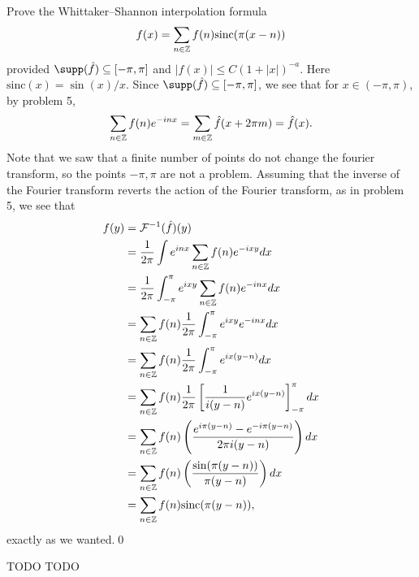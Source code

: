 \documentclass{article}
\begin{document}
\newpage
{} Prove the Whittaker–Shannon interpolation formula
\[f(x) = \sum_{n\in \mathbb{Z}}
f(n)\text{sinc}(\pi(x -n))\]
provided $\supp(\hat{f}) \sse [-\pi,\pi]$ and $|f(x)|\le C(1 + |x|)^{-a}$. Here $\text{sinc}(x) = \sin(x)/x$.  \tri
\hop 
\solution
Since $\supp(\hat{f}) \sse [-\pi, \pi]$, we see that for $x \in (-\pi,\pi)$, by problem 5,
\begin{align*}
    \sum_{n \in \mathbb{Z}}f(n) e^{-inx} = \sum_{m \in \mathbb{Z}} \hat{f}(x + 2\pi m) = \hat{f}(x).
\end{align*}
Note that we saw that a finite number of points do not change the fourier transform, so the points $-\pi, \pi$ are not a problem. Assuming that the inverse of the Fourier transform reverts the action of the Fourier transform, as in problem 5, we see that 
\begin{align*}
    f(y) &= \cal{F}\inv(\hat{f})(y) \\
    &= \frac{1}{2\pi}\int e^{inx}\sum_{n\in \ZZ} f(n)e^{-ixy}dx \\
    &= \frac{1}{2\pi}\int_{-\pi}^\pi e^{ixy}\sum_{n\in \ZZ} f(n)e^{-inx}dx \\
    &=\sum_{n\in \ZZ} f(n) \frac{1}{2\pi}\int_{-\pi}^\pi e^{ixy}e^{-inx}dx \\
    &=\sum_{n\in \ZZ} f(n) \frac{1}{2\pi}\int_{-\pi}^\pi e^{ix(y-n)}dx \\
    &=\sum_{n\in \ZZ} f(n) \frac{1}{2\pi}\sbr{\frac{1}{i(y-n)}e^{ix(y-n)}}_{-\pi}^\pi dx \\
    &=\sum_{n\in \ZZ} f(n) \del{\frac{e^{i\pi(y-n)}-e^{-i\pi(y-n)}}{2\pi i(y-n)}} dx\\
    &=\sum_{n\in \ZZ} f(n) \del{\frac{\sin(\pi(y-n))}{\pi (y-n)}} dx\\
    &=\sum_{n\in \ZZ} f(n) \text{sinc}(\pi(y-n)),\\
\end{align*}
exactly as we wanted.\qed



\newpage
{} TODO  \tri
\hop 
\solution
TODO
\end{document}
